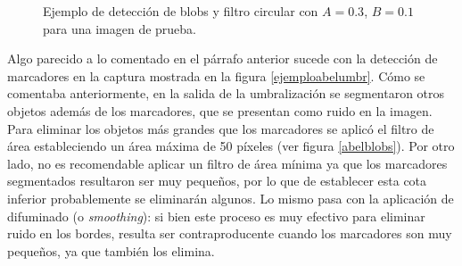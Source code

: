 \begin{figure}[H]
  \caption{Ejemplo de detección de blobs y filtro circular con $A=0.3$, $B=0.1$ para una imagen de prueba.}
      \label{ejemplodetectCirculos}
\end{figure}

Algo parecido a lo comentado en el párrafo anterior sucede con la detección de marcadores en la captura mostrada en la figura \ref{ejemploabelumbr}. Cómo se comentaba anteriormente, en la salida de la umbralización se segmentaron otros objetos además de los marcadores, que se presentan como ruido en la imagen. Para eliminar los objetos más grandes que los marcadores se aplicó el filtro de área estableciendo un área máxima de 50 píxeles (ver figura \ref{abelblobs}). Por otro lado, no es recomendable aplicar un filtro de área mínima ya que los marcadores segmentados resultaron ser muy pequeños, por lo que de establecer esta cota inferior probablemente se eliminarán algunos. Lo mismo pasa con la aplicación de difuminado (o \textit{smoothing}): si bien este proceso es muy efectivo para eliminar ruido en los bordes, resulta ser contraproducente cuando los marcadores son muy pequeños, ya que también los elimina.

